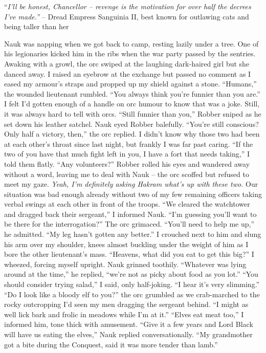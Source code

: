 \documentclass[12pt, openany]{book}
\begin{document}
“\textit{I’ll be honest, Chancellor – revenge is the motivation for over half the decrees I’ve made.”}
– Dread Empress Sanguinia II, best known for outlawing cats and being taller than her

Nauk was napping when we got back to camp, resting lazily under a tree. One of his legionaries kicked him in the ribs when the war party passed by the sentries. Awaking with a growl, the orc swiped at the laughing dark-haired girl but she danced away. I raised an eyebrow at the exchange but passed no comment as I eased my armour’s straps and propped up my shield against a stone.
“Humans,” the wounded lieutenant rumbled. “You always think you’re funnier than you are.”
I felt I’d gotten enough of a handle on orc humour to know that was a joke. Still, it was always hard to tell with orcs.
“Still funnier than you,” Robber sniped as he set down his leather satchel.
Nauk eyed Robber balefully.
“You’re still conscious? Only half a victory, then,” the orc replied.
I didn’t know why those two had been at each other’s throat since last night, but frankly I was far past caring.
“If the two of you have that much fight left in you, I have a fort that needs taking,” I told them flatly. “Any volunteers?”
Robber rolled his eyes and wandered away without a word, leaving me to deal with Nauk – the orc scoffed but refused to meet my gaze. \textit{Yeah, I’m definitely asking Hakram what’s up with these two.} Our situation was bad enough already without two of my few remaining officers taking verbal swings at each other in front of the troops.
“We cleared the watchtower and dragged back their sergeant,” I informed Nauk. “I’m guessing you’ll want to be there for the interrogation?”
The orc grimaced.
“You’ll need to help me up,” he admitted. “My leg hasn’t gotten any better.”
I crouched next to him and slung his arm over my shoulder, knees almost buckling under the weight of him as I bore the other lieutenant’s mass.
“Heavens, what did you eat to get this big?” I wheezed, forcing myself upright.
Nauk grinned toothily.
“Whatever was lying around at the time,” he replied, “we’re not as picky about food as you lot.”
“You should consider trying salad,” I said, only half-joking. “I hear it’s very slimming.”
“Do I look like a bloody elf to you?” the orc grumbled as we crab-marched to the rocky outcropping I’d seen my men dragging the sergeant behind. “I might as well lick bark and frolic in meadows while I’m at it.”
“Elves eat meat too,” I informed him, tone thick with amusement.
“Give it a few years and Lord Black will have us eating the elves,” Nauk replied conversationally. “My grandmother got a bite during the Conquest, said it was more tender than lamb.”
\end{document}
